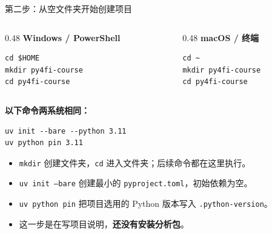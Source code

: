 \documentclass[9pt]{ctexbeamer}
\begin{document}
\begin{frame}[fragile]{第二步：从空文件夹开始创建项目}
  \begin{columns}[T,totalwidth=\textwidth]
    \begin{column}{0.48\textwidth}
      \textbf{Windows / PowerShell}
\begin{lstlisting}[language={},numbers=none]
cd $HOME
mkdir py4fi-course
cd py4fi-course
\end{lstlisting}
    \end{column}
    \begin{column}{0.48\textwidth}
      \textbf{macOS / 终端}
\begin{lstlisting}[language={},numbers=none]
cd ~
mkdir py4fi-course
cd py4fi-course
\end{lstlisting}
    \end{column}
  \end{columns}
  \textbf{以下命令两系统相同：}
\begin{lstlisting}[language={},numbers=none]
uv init --bare --python 3.11
uv python pin 3.11
\end{lstlisting}
  \begin{itemize}
    \item \texttt{mkdir} 创建文件夹，\texttt{cd} 进入文件夹；后续命令都在这里执行。
    \item \texttt{uv init --bare} 创建最小的 \texttt{pyproject.toml}，初始依赖为空。
    \item \texttt{uv python pin} 把项目选用的 Python 版本写入 \texttt{.python-version}。
    \item 这一步是在写项目说明，\textbf{还没有安装分析包}。
  \end{itemize}
\end{frame}
\end{document}
